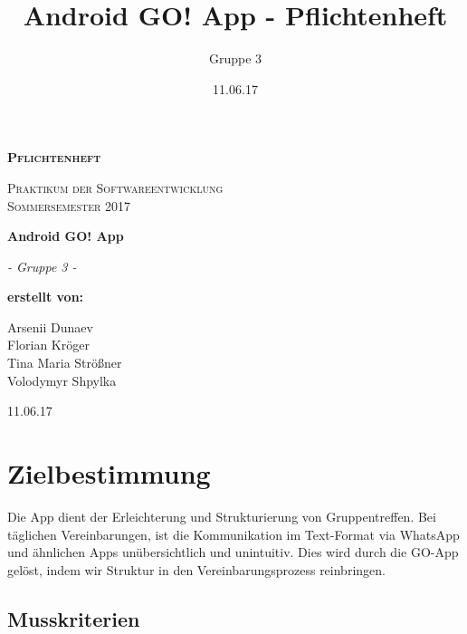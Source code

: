 \documentclass[parskip=full]{scrartcl}
\title{Android GO! App - Pflichtenheft}
\author{Gruppe 3}
\date{11.06.17}
\begin{document}
\begin{titlepage}
	\begin{center}
	{\scshape\LARGE \bfseries Pflichtenheft \par}
	\vspace{1cm}
	{\scshape\Large Praktikum der Softwareentwicklung \\ Sommersemester 2017\par}
	\vspace{1.5cm}
	{\huge\bfseries Android GO! App\par}
	\vspace{2cm}
	{\Large\itshape - Gruppe 3 -\par}
	\vfill
	{\bfseries erstellt von:\par}
	Arsenii Dunaev \\
	Florian Kröger \\
	Tina Maria Strößner \\
	Volodymyr Shpylka \\	
	\vfill
	{\large 11.06.17 \par}	
	\end{center}
\end{titlepage}

\tableofcontents

\newpage
\section{Zielbestimmung}
Die \gls{App} dient der Erleichterung und Strukturierung von Gruppentreffen. 
 Bei täglichen Vereinbarungen, ist die Kommunikation im Text-Format via WhatsApp und ähnlichen Apps unübersichtlich und unintuitiv. 
Dies wird durch die GO-App gelöst, indem wir Struktur in den Vereinbarungsprozess reinbringen.  
\subsection{Musskriterien}
\end{document}
